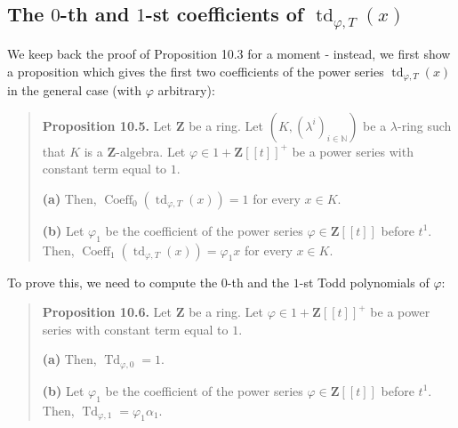 \documentclass[numbers=enddot,12pt,final,onecolumn,notitlepage]{scrartcl}%
\begin{document}
\subsection{The $0$-th and $1$-st coefficients of $\operatorname*{td}%
\nolimits_{\varphi,T}\left(  x\right)  $}

We keep back the proof of Proposition 10.3 for a moment - instead, we first
show a proposition which gives the first two coefficients of the power series
$\operatorname*{td}\nolimits_{\varphi,T}\left(  x\right)  $ in the general
case (with $\varphi$ arbitrary):

\begin{quote}
\textbf{Proposition 10.5.} Let $\mathbf{Z}$ be a ring. Let $\left(  K,\left(
\lambda^{i}\right)  _{i\in\mathbb{N}}\right)  $ be a $\lambda$-ring such that
$K$ is a $\mathbf{Z}$-algebra. Let $\varphi\in1+\mathbf{Z}\left[  \left[
t\right]  \right]  ^{+}$ be a power series with constant term equal to $1$.

\textbf{(a)} Then, $\operatorname*{Coeff}\nolimits_{0}\left(
\operatorname*{td}\nolimits_{\varphi,T}\left(  x\right)  \right)  =1$ for
every $x\in K$.

\textbf{(b)} Let $\varphi_{1}$ be the coefficient of the power series
$\varphi\in\mathbf{Z}\left[  \left[  t\right]  \right]  $ before $t^{1}$.
Then, $\operatorname*{Coeff}\nolimits_{1}\left(  \operatorname*{td}%
\nolimits_{\varphi,T}\left(  x\right)  \right)  =\varphi_{1}x$ for every $x\in
K$.
\end{quote}

To prove this, we need to compute the $0$-th and the $1$-st Todd polynomials
of $\varphi$:

\begin{quote}
\textbf{Proposition 10.6.} Let $\mathbf{Z}$ be a ring. Let $\varphi
\in1+\mathbf{Z}\left[  \left[  t\right]  \right]  ^{+}$ be a power series with
constant term equal to $1$.

\textbf{(a)} Then, $\operatorname*{Td}\nolimits_{\varphi,0}=1$.

\textbf{(b)} Let $\varphi_{1}$ be the coefficient of the power series
$\varphi\in\mathbf{Z}\left[  \left[  t\right]  \right]  $ before $t^{1}$.
Then, $\operatorname*{Td}\nolimits_{\varphi,1}=\varphi_{1}\alpha_{1}$.
\end{quote}
\end{document}
